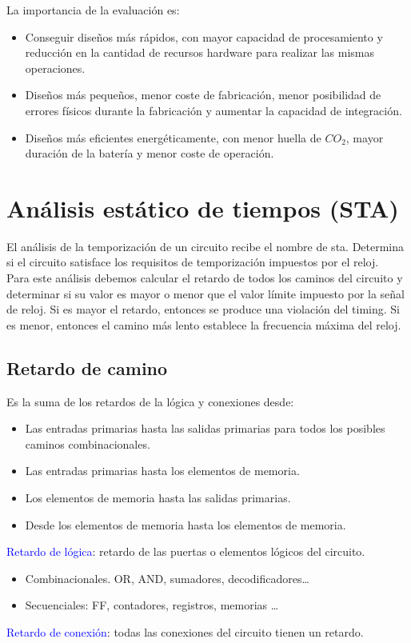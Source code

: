 La importancia de la evaluación es:
\begin{itemize}
	\item Conseguir diseños más rápidos, con mayor capacidad de procesamiento y reducción en la cantidad de recursos hardware para realizar las mismas operaciones.
	\item Diseños más pequeños, menor coste de fabricación, menor posibilidad de errores físicos durante la fabricación y aumentar la capacidad de integración.
	\item Diseños más eficientes energéticamente, con menor huella de $CO_{2}$, mayor duración de la batería y menor coste de operación.
\end{itemize}

\section{Análisis estático de tiempos (STA)}
El análisis de la temporización de un circuito recibe el nombre de \gls{sta}. Determina si el circuito satisface los requisitos de temporización impuestos por el reloj.
\\ Para este análisis debemos calcular el retardo de todos los caminos del circuito y determinar si su valor es mayor o menor que el valor límite impuesto por la señal de reloj. Si es mayor el retardo, entonces se produce una violación del timing. Si es menor, entonces el camino más lento establece la frecuencia máxima del reloj.

\subsection{Retardo de camino}
Es la suma de los retardos de la lógica y conexiones desde:
\begin{itemize}
	\item Las entradas primarias hasta las salidas primarias para todos los posibles caminos combinacionales.
	\item Las entradas primarias hasta los elementos de memoria.
	\item Los elementos de memoria hasta las salidas primarias.
	\item Desde los elementos de memoria hasta los elementos de memoria.
\end{itemize}
\textcolor{blue}{Retardo de lógica}: retardo de las puertas o elementos lógicos del circuito.
\begin{itemize}
	\item Combinacionales. OR, AND, sumadores, decodificadores\dots
	\item Secuenciales: FF, contadores, registros, memorias \dots
\end{itemize}
\textcolor{blue}{Retardo de conexión}: todas las conexiones del circuito tienen un retardo.

